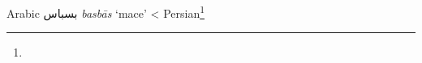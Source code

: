\begin{etymology}\label{ety:basbas}
Arabic {بسباس} \textit{basbās} `mace'
< Persian\footnote{}
\end{etymology}